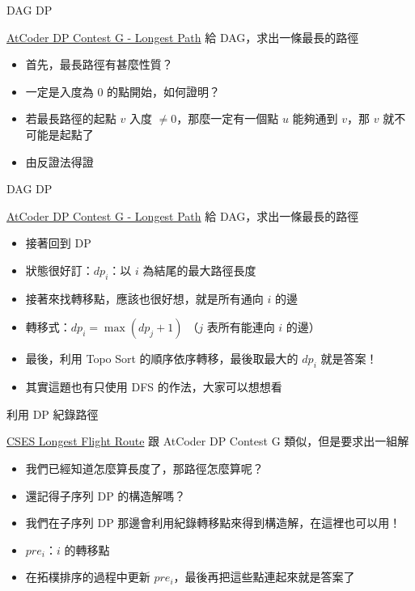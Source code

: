 \documentclass[aspectratio=169]{beamer}
\begin{document}
    \begin{frame}{DAG DP}
        \begin{block}{\href{https://atcoder.jp/contests/dp/tasks/dp_g}{AtCoder DP Contest G - Longest Path}}
            給 DAG，求出一條最長的路徑
        \end{block}

        \begin{itemize}
            \item<1-> 首先，最長路徑有甚麼性質？
            \item<2-> 一定是入度為 0 的點開始，如何證明？
            \item<3-> 若最長路徑的起點 $v$ 入度 $\neq 0$，那麼一定有一個點 $u$ 能夠通到 $v$，那 $v$ 就不可能是起點了
            \item<4-> 由反證法得證
        \end{itemize}
    \end{frame}

    \begin{frame}{DAG DP}
        \begin{block}{\href{https://atcoder.jp/contests/dp/tasks/dp_g}{AtCoder DP Contest G - Longest Path}}
            給 DAG，求出一條最長的路徑
        \end{block}

        \begin{itemize}
            \item<1-> 接著回到 DP
            \item<2-> 狀態很好訂：$dp_i$：以 $i$ 為結尾的最大路徑長度
            \item<3-> 接著來找轉移點，應該也很好想，就是所有通向 $i$ 的邊
            \item<4-> 轉移式：$dp_i = \max(dp_j + 1)$ （$j$ 表所有能連向 $i$ 的邊） 
            \item<5-> 最後，利用 Topo Sort 的順序依序轉移，最後取最大的 $dp_i$ 就是答案！
            \item<6-> 其實這題也有只使用 DFS 的作法，大家可以想想看
        \end{itemize}
    \end{frame}

    \begin{frame}{利用 DP 紀錄路徑}
        \begin{block}{\href{https://cses.fi/problemset/task/1680/}{CSES Longest Flight Route}}
            跟 AtCoder DP Contest G 類似，但是要求出一組解
        \end{block}

        \begin{itemize}
            \item<1-> 我們已經知道怎麼算長度了，那路徑怎麼算呢？
            \item<2-> 還記得子序列 DP 的構造解嗎？
            \item<2-> 我們在子序列 DP 那邊會利用紀錄轉移點來得到構造解，在這裡也可以用！
            \item<3-> $pre_i$：$i$ 的轉移點
            \item<4-> 在拓樸排序的過程中更新 $pre_i$，最後再把這些點連起來就是答案了
        \end{itemize}
    \end{frame}
    
\end{document}
